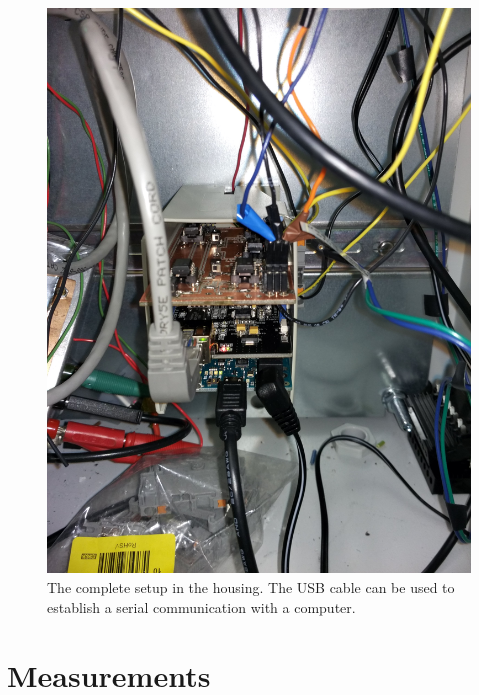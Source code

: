 \documentclass[12pt]{scrartcl}
\begin{document}
      \begin{figure}[H]
        \includegraphics[width = \textwidth]{imschrank.jpg}
        \caption{The complete setup in the housing. The USB cable can be used
        to establish a serial communication with a computer.}
        \label{fig7}
      \end{figure}
    \newpage
    \section{Measurements}
\end{document}
